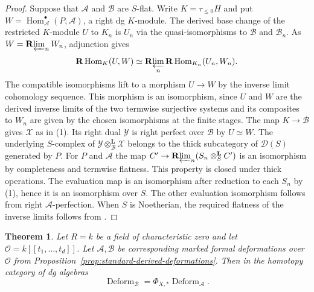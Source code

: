 \documentclass[12pt,a4paper,english,reqno]{amsart}
\numberwithin{equation}{section}
\theoremstyle{plain}
\newtheorem{theorem}{Theorem}[section]
\theoremstyle{definition}
\begin{document}
\begin{proof}
Suppose that $\mathcal A$ and $\mathcal B$ are $S$-flat.
Write $K=\tau_{\le0}H$ and put
$W=\operatorname{Hom}_{\mathcal A}^\bullet(P,\mathcal A)$,
a right dg $K$-module. The derived base change of the restricted
$K$-module $U$ to $K_n$ is $U_n$ via the quasi-isomorphisms
to $\mathcal B$ and $\mathcal B_n$. As
$W=\mathbf R\!\varprojlim_n W_n$, adjunction gives
\[
 \mathbf R\operatorname{Hom}_{K}(U,W)
  \simeq \mathbf R\!\varprojlim_n
     \mathbf R\operatorname{Hom}_{K_n}(U_n,W_n).
\]
The compatible isomorphisms lift to a morphism $U\to W$ by the
inverse limit cohomology sequence. This morphism is an
isomorphism, since $U$ and $W$ are the derived inverse limits
of the two termwise surjective systems and its composites
to $W_n$ are given by the chosen isomorphisms at the finite
stages. The map $K\to\mathcal B$ gives $\mathcal X$ as in (1).
Its right dual
$\mathcal Y$ is right perfect over $\mathcal B$ by $U\simeq W$.
The underlying $S$-complex of
$\mathcal Y\otimes_{\mathcal B}^{\mathbf L}\mathcal X$
belongs to the thick subcategory of $\mathcal D(S)$ generated
by $P$. For $P$ and $\mathcal A$ the map
$C'\to\mathbf R\!\varprojlim_n(S_n\otimes_S^{\mathbf L}C')$
is an isomorphism by completeness and termwise flatness.
This property is closed under thick operations. The evaluation
map is an isomorphism after reduction to each $S_n$ by (1),
hence it is an isomorphism over $S$. The other evaluation
isomorphism follows from right $\mathcal A$-perfection.
When $S$ is Noetherian, the required flatness of the inverse
limits follows from \cite[Theorem~5.11]{Yekutieli2018Completion}.
\end{proof}

\begin{theorem}\label{thm:bg-standard-derived}
Let $R=k$ be a field of characteristic zero and let
$\mathcal O=k[[t_1,\ldots,t_d]]$. Let $\mathcal A,\mathcal B$ be
corresponding marked formal deformations over $\mathcal O$ from
Proposition~\ref{prop:standard-derived-deformations}. Then in
the homotopy category of dg algebras
\[
        \operatorname{Deform}_{\mathcal B}
             =\Phi_{X,*}\operatorname{Deform}_{\mathcal A}.
\]
\end{theorem}
\end{document}
